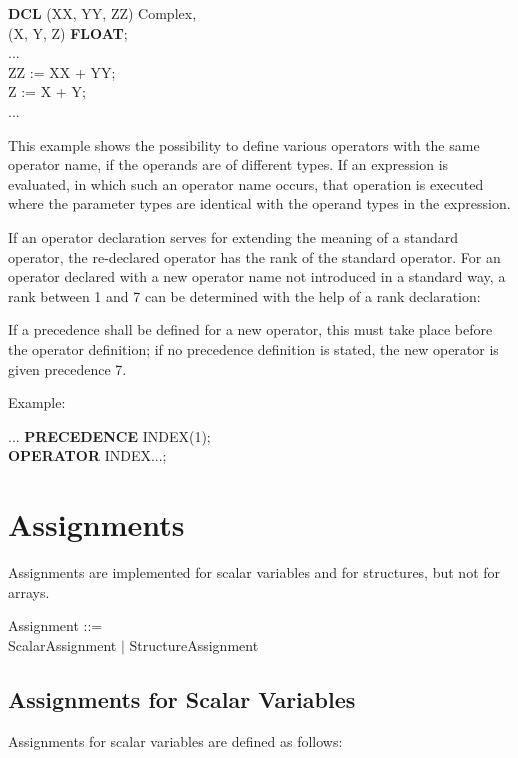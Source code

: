 \begin{removed}
{\bf DCL} (XX, YY, ZZ) Complex,\\
\x (X, Y, Z) {\bf FLOAT};\\
...\\
ZZ := XX + YY;\\
Z := X + Y;\\
...

This example shows the possibility to define various operators with the
same operator name, if the operands are of different types. If an
expression is evaluated, in which such an operator name occurs, that
operation is executed where the parameter types are identical with the
operand types in the expression.

If an operator declaration serves for extending the meaning of a
standard operator, the re-declared operator has the rank of the standard
operator. For an operator declared with a new operator name not
introduced in a standard way, a rank between 1 and 7 can be determined
with the help of a rank declaration:



If a precedence shall be defined for a new operator, this must take place
before the operator definition; if no precedence definition is stated, the
new operator is given precedence 7.

Example:

...
{\bf PRECEDENCE} INDEX(1);\\
{\bf OPERATOR} INDEX...;
\end{removed}


\section{Assignments}   %

Assignments are implemented for scalar variables and for structures, but
not for arrays.

\begin{front}
Assignment ::=\\
\x ScalarAssignment $\mid$ StructureAssignment
\end{front}
\begin{grammar}

\end{grammar}

\subsection{Assignments for Scalar Variables}   %

Assignments for scalar variables are defined as follows:

